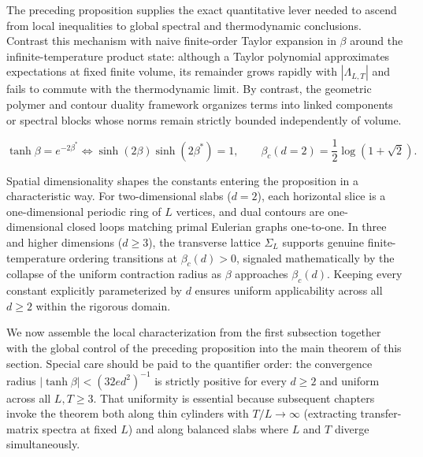 \documentclass[11pt]{article}
\theoremstyle{definition}
\begin{document}
The preceding proposition supplies the exact quantitative lever needed to ascend
from local inequalities to global spectral and thermodynamic conclusions. Contrast
this mechanism with naive finite-order Taylor expansion in $\beta$ around the
infinite-temperature product state: although a Taylor polynomial approximates
expectations at fixed finite volume, its remainder grows rapidly with
$|\Lambda_{L,T}|$ and fails to commute with the thermodynamic limit. By contrast,
the geometric polymer and contour duality framework organizes terms into linked
components or spectral blocks whose norms remain strictly bounded independently of
volume.

\[
  \tanh \beta = e^{-2\beta^*} \iff \sinh(2\beta) \sinh(2\beta^*) = 1, \qquad \beta_c(d=2) = \frac{1}{2} \log(1 + \sqrt{2}).
\]

Spatial dimensionality shapes the constants entering the proposition in a
characteristic way. For two-dimensional slabs ($d = 2$), each horizontal slice is a
one-dimensional periodic ring of $L$ vertices, and dual contours are one-dimensional
closed loops matching primal Eulerian graphs one-to-one. In three and higher
dimensions ($d \ge 3$), the transverse lattice $\Sigma_L$ supports genuine
finite-temperature ordering transitions at $\beta_c(d) > 0$, signaled mathematically
by the collapse of the uniform contraction radius as $\beta$ approaches
$\beta_c(d)$. Keeping every constant explicitly parameterized by $d$ ensures uniform
applicability across all $d \ge 2$ within the rigorous domain.

We now assemble the local characterization from the first subsection together with
the global control of the preceding proposition into the main theorem of this
section. Special care should be paid to the quantifier order: the convergence radius
$|\tanh \beta| < (32 e d^2)^{-1}$ is strictly positive for every $d \ge 2$ and
uniform across all $L, T \ge 3$. That uniformity is essential because subsequent
chapters invoke the theorem both along thin cylinders with $T/L \to \infty$
(extracting transfer-matrix spectra at fixed $L$) and along balanced slabs where $L$
and $T$ diverge simultaneously.
\end{document}
